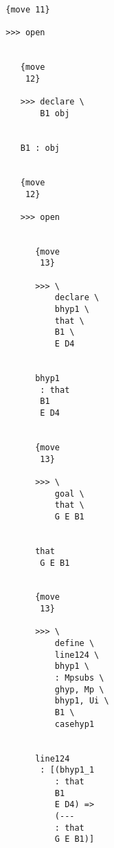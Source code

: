 \documentclass[12pt]{article}
\begin{document}
\begin{verbatim}
                                 {move 11}

                                 >>> open


                                    {move 
                                     12}

                                    >>> declare \
                                        B1 obj


                                    B1 : obj


                                    {move 
                                     12}

                                    >>> open


                                       {move 
                                        13}

                                       >>> \
                                           declare \
                                           bhyp1 \
                                           that \
                                           B1 \
                                           E D4


                                       bhyp1 
                                        : that 
                                        B1 
                                        E D4


                                       {move 
                                        13}

                                       >>> \
                                           goal \
                                           that \
                                           G E B1


                                       that 
                                        G E B1


                                       {move 
                                        13}

                                       >>> \
                                           define \
                                           line124 \
                                           bhyp1 \
                                           : Mpsubs \
                                           ghyp, Mp \
                                           bhyp1, Ui \
                                           B1 \
                                           casehyp1


                                       line124 
                                        : [(bhyp1_1 
                                           : that 
                                           B1 
                                           E D4) => 
                                           (--- 
                                           : that 
                                           G E B1)]



\end{verbatim}
\end{document}

